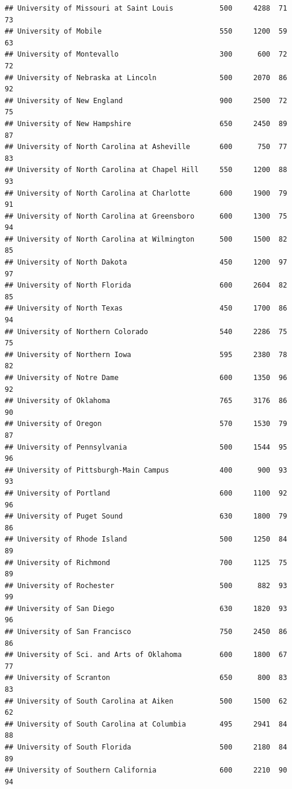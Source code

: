 \documentclass[
]{article}
\begin{document}
\begin{verbatim}
## University of Missouri at Saint Louis           500     4288  71       73
## University of Mobile                            550     1200  59       63
## University of Montevallo                        300      600  72       72
## University of Nebraska at Lincoln               500     2070  86       92
## University of New England                       900     2500  72       75
## University of New Hampshire                     650     2450  89       87
## University of North Carolina at Asheville       600      750  77       83
## University of North Carolina at Chapel Hill     550     1200  88       93
## University of North Carolina at Charlotte       600     1900  79       91
## University of North Carolina at Greensboro      600     1300  75       94
## University of North Carolina at Wilmington      500     1500  82       85
## University of North Dakota                      450     1200  97       97
## University of North Florida                     600     2604  82       85
## University of North Texas                       450     1700  86       94
## University of Northern Colorado                 540     2286  75       75
## University of Northern Iowa                     595     2380  78       82
## University of Notre Dame                        600     1350  96       92
## University of Oklahoma                          765     3176  86       90
## University of Oregon                            570     1530  79       87
## University of Pennsylvania                      500     1544  95       96
## University of Pittsburgh-Main Campus            400      900  93       93
## University of Portland                          600     1100  92       96
## University of Puget Sound                       630     1800  79       86
## University of Rhode Island                      500     1250  84       89
## University of Richmond                          700     1125  75       89
## University of Rochester                         500      882  93       99
## University of San Diego                         630     1820  93       96
## University of San Francisco                     750     2450  86       86
## University of Sci. and Arts of Oklahoma         600     1800  67       77
## University of Scranton                          650      800  83       83
## University of South Carolina at Aiken           500     1500  62       62
## University of South Carolina at Columbia        495     2941  84       88
## University of South Florida                     500     2180  84       89
## University of Southern California               600     2210  90       94

\end{verbatim}
\end{document}

